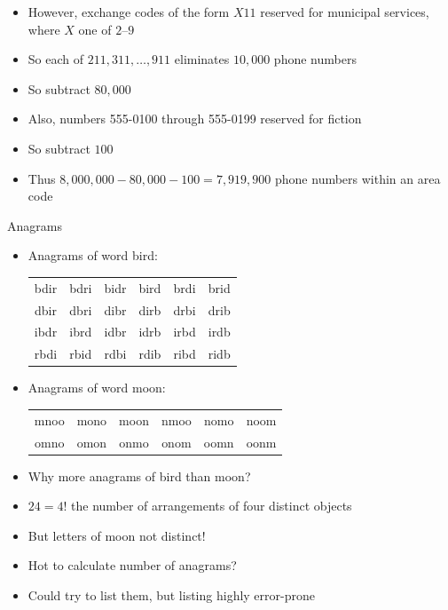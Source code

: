 \documentclass{beamer}
\theoremstyle{definition}
\begin{document}
\begin{frame}
\begin{itemize}
\item However, exchange codes of the form $X11$
reserved for municipal services, where $X$ one of $2$--$9$
\item So each of $211,311,\ldots,911$ eliminates $10,000$ phone numbers
\item So subtract $80,000$
\item Also, numbers 555-0100 through 555-0199 reserved for fiction
\item So subtract $100$
\item Thus $8,000,000-80,000-100=7,919,900$ phone numbers within an area code
\end{itemize}
\end{frame}

\begin{frame}{Anagrams}
\begin{itemize}
\item Anagrams of word \alert{bird}:
\begin{tabular}{cccccc}
bdir &bdri &bidr &bird &brdi &brid\\
dbir &dbri &dibr &dirb &drbi &drib\\
ibdr &ibrd &idbr &idrb &irbd &irdb\\
rbdi &rbid &rdbi &rdib &ribd &ridb 
\end{tabular}
\item Anagrams of word \alert{moon}:
\begin{tabular}{cccccc}
mnoo &mono &moon &nmoo &nomo &noom\\
omno &omon &onmo &onom &oomn &oonm 
\end{tabular}
\item Why more anagrams of \alert{bird} than \alert{moon}?
\item $24=4!$ the number of arrangements of four \alert{distinct} objects
\item But letters of \alert{moon} not distinct!
\item Hot to calculate number of anagrams?
\item Could try to list them, but listing highly error-prone
\end{itemize}
\end{frame}
\end{document}
